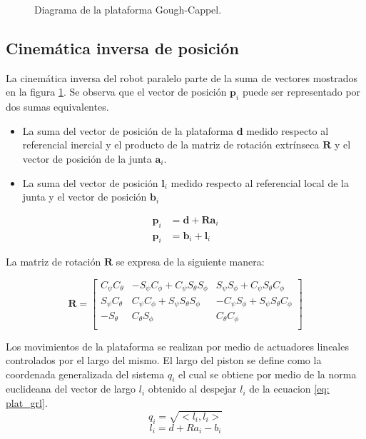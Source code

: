 \begin{figure}[htb!]
    \centering
    \caption{Diagrama de la plataforma Gough-Cappel.}
    \label{fig: gough stewart diagram}
\end{figure}

\subsection{Cinemática inversa de posición}

La cinemática inversa del robot paralelo parte de la suma de vectores 
mostrados en la figura \ref{fig: gough stewart diagram}.
Se observa que el vector de posición $\mathbf p_i$ puede ser representado 
por dos sumas equivalentes. 
\begin{itemize}
 \item La suma del vector de posición de la plataforma $\mathbf d$ 
medido respecto al referencial inercial y el producto de 
la matriz de rotación extrínseca $\mathbf R$ y el vector de posición 
de la junta $\mathbf a_i$. 
 \item La suma del vector de posición $\mathbf l_i$ medido respecto 
 al referencial local de la junta y el vector de posición $\mathbf b_i$
\end{itemize}

\begin{subequations} \label{eq: plat_grl}
 \begin{align}
    \mathbf p_i & = \mathbf d + \mathbf R\mathbf a_i \\
    \mathbf p_i & = \mathbf b_i + \mathbf l_i
 \end{align}
\end{subequations}

La matriz de rotación $\mathbf R$ se expresa de la siguiente manera:

\begin{equation} \label{eq: Mrot-P}
\mathbf R = \begin{bmatrix}
C_\psi C_\theta & -S_\psi C_\phi + C_\psi S_\theta S_\phi & S_\psi S_\phi + C_\psi S_\theta C_\phi\\
S_\psi C_\theta & C_\psi C_\phi + S_\psi S_\theta S_\phi & -C_\psi S_\phi + S_\psi S_\theta C_\phi\\
-S_\theta & C_\theta S_\phi & C_\theta C_\phi\\
\end{bmatrix}
\end{equation}

Los movimientos de la plataforma se realizan por medio de actuadores lineales controlados 
por el largo del mismo. El largo del piston se define como la coordenada generalizada del 
sistema $q_i$ el cual se obtiene por medio de la norma euclideana del vector de largo 
$l_i$ obtenido al despejar $l_i$ de la ecuacion \ref{eq: plat_grl}.
\begin{equation} \label{eq: coord_grl}
q_i = \sqrt{<l_i,l_i>}
\end{equation}
\begin{equation} \label{eq: largo_act}
l_i = d + Ra_i - b_i
\end{equation}

